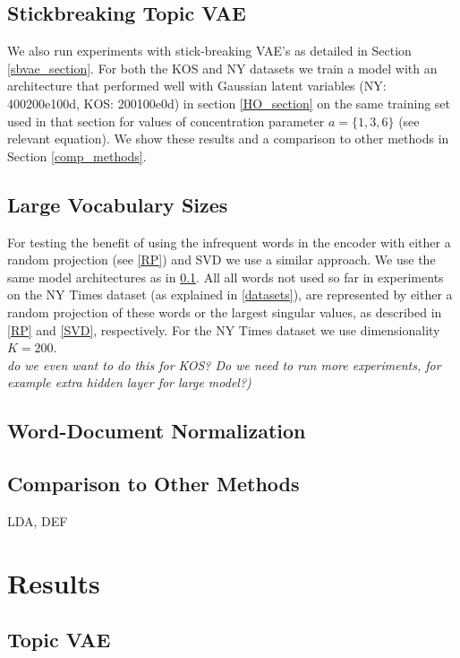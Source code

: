 \documentclass{report}
\begin{document}
	\subsection{Stickbreaking Topic VAE}\label{sbvae_exp}
	
	We also run experiments with stick-breaking VAE's as detailed in Section \ref{sbvae_section}. For both the KOS and NY datasets we train a model with an architecture that performed well with Gaussian latent variables (NY: 400200e100d, KOS: 200100e0d) in section \ref{HO_section} on the same training set used in that section for values of concentration parameter $a= \{1,3,6\}$ (see relevant equation). We show these results and a comparison to other methods in Section \ref{comp_methods}.
	
	\subsection{Large Vocabulary Sizes}
	For testing the benefit of using the infrequent words in the encoder with either a random projection (see \ref{RP}) and SVD  we use a similar approach. We use the same model architectures as in \ref{sbvae_exp}. All all words not used so far in experiments on the NY Times dataset (as explained in \ref{datasets}), are represented by either a random projection of these words or the largest singular values, as described in \ref{RP} and \ref{SVD}, respectively. For the NY Times dataset we use dimensionality $K = 200$. \\
	\textit{do we even want to do this for KOS? Do we need to run more experiments, for example extra hidden layer for large model?)}
	
	\subsection{Word-Document Normalization}
	
	\subsection{Comparison to Other Methods}
	LDA, DEF
	
	
	
	\section{Results}
	
	\subsection{Topic VAE}
	
\end{document}
